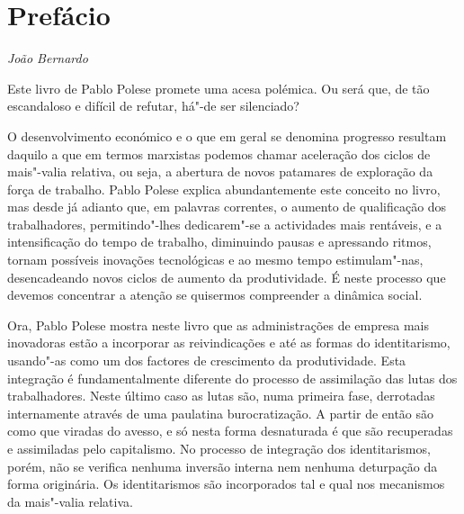 

\chapter*{Prefácio}

\begin{flushright}
\emph{João Bernardo}
\end{flushright}

Este livro de Pablo Polese promete uma acesa polémica. Ou será que, de
tão escandaloso e difícil de refutar, há"-de ser silenciado?

O desenvolvimento económico e o que em geral se denomina progresso
resultam daquilo a que em termos marxistas podemos chamar aceleração dos
ciclos de mais"-valia relativa, ou seja, a abertura de novos patamares de
exploração da força de trabalho. Pablo Polese explica abundantemente
este conceito no livro, mas desde já adianto que, em palavras correntes,
o aumento de qualificação dos trabalhadores, permitindo"-lhes
dedicarem"-se a actividades mais rentáveis, e a intensificação do tempo
de trabalho, diminuindo pausas e apressando ritmos, tornam possíveis
inovações tecnológicas e ao mesmo tempo estimulam"-nas, desencadeando
novos ciclos de aumento da produtividade. É neste processo que devemos
concentrar a atenção se quisermos compreender a dinâmica social.

Ora, Pablo Polese mostra neste livro que as administrações de empresa
mais inovadoras estão a incorporar as reivindicações e até as formas do
identitarismo, usando"-as como um dos factores de crescimento da
produtividade. Esta integração é fundamentalmente diferente do processo
de assimilação das lutas dos trabalhadores. Neste último caso as lutas
são, numa primeira fase, derrotadas internamente através de uma
paulatina burocratização. A partir de então são como que viradas do
avesso, e só nesta forma desnaturada é que são recuperadas e assimiladas
pelo capitalismo. No processo de integração dos identitarismos, porém,
não se verifica nenhuma inversão interna nem nenhuma deturpação da forma
originária. Os identitarismos são incorporados tal e qual nos mecanismos
da mais"-valia relativa.

